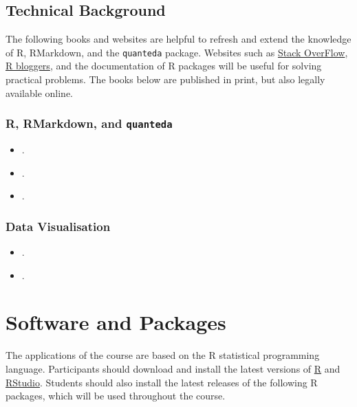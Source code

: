 \documentclass[abstract=on,parskip=full,headings=standardclasses,fontsize=11pt,paper=a4]{scrartcl}
\begin{document}
\subsection*{Technical Background}

The following books and websites are helpful to refresh and extend the knowledge of  \textsf{R}, RMarkdown, and the \texttt{quanteda} package.  Websites such as \href{https://stackoverflow.com/}{Stack OverFlow}, \href{https://www.r-bloggers.com}{R bloggers}, and the documentation of \textsf{R} packages will be useful for solving practical problems. The books below are published in print, but also legally available online.

\subsubsection*{\textsf{R}, RMarkdown, and \texttt{quanteda}}
\begin{itemize}
\item {}.
\item {}.
\item {}.
\end{itemize}

\subsubsection*{Data Visualisation}

\begin{itemize}
\item {}.
\item {}.
\end{itemize}

\section*{Software and Packages}

The applications of the course are based on the \textsf{R} statistical programming language. Participants should download and install the latest versions of \textsf{\href{https://www.r-project.org}{R}} and \href{https://www.rstudio.com/products/rstudio/}{RStudio}. Students should also install the latest releases of the following  \textsf{R} packages, which will be used throughout the course.
\end{document}
